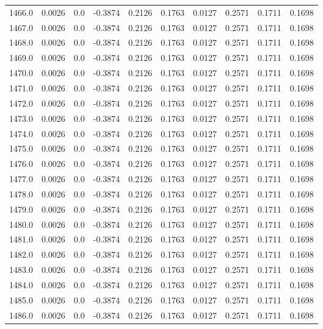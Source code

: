 \begin{longtable}{lrrrrrrrrr}
1466.0 & 0.0026 & 0.0 & -0.3874 & 0.2126 & 0.1763 & 0.0127 & 0.2571 & 0.1711 & 0.1698 \\
1467.0 & 0.0026 & 0.0 & -0.3874 & 0.2126 & 0.1763 & 0.0127 & 0.2571 & 0.1711 & 0.1698 \\
1468.0 & 0.0026 & 0.0 & -0.3874 & 0.2126 & 0.1763 & 0.0127 & 0.2571 & 0.1711 & 0.1698 \\
1469.0 & 0.0026 & 0.0 & -0.3874 & 0.2126 & 0.1763 & 0.0127 & 0.2571 & 0.1711 & 0.1698 \\
1470.0 & 0.0026 & 0.0 & -0.3874 & 0.2126 & 0.1763 & 0.0127 & 0.2571 & 0.1711 & 0.1698 \\
1471.0 & 0.0026 & 0.0 & -0.3874 & 0.2126 & 0.1763 & 0.0127 & 0.2571 & 0.1711 & 0.1698 \\
1472.0 & 0.0026 & 0.0 & -0.3874 & 0.2126 & 0.1763 & 0.0127 & 0.2571 & 0.1711 & 0.1698 \\
1473.0 & 0.0026 & 0.0 & -0.3874 & 0.2126 & 0.1763 & 0.0127 & 0.2571 & 0.1711 & 0.1698 \\
1474.0 & 0.0026 & 0.0 & -0.3874 & 0.2126 & 0.1763 & 0.0127 & 0.2571 & 0.1711 & 0.1698 \\
1475.0 & 0.0026 & 0.0 & -0.3874 & 0.2126 & 0.1763 & 0.0127 & 0.2571 & 0.1711 & 0.1698 \\
1476.0 & 0.0026 & 0.0 & -0.3874 & 0.2126 & 0.1763 & 0.0127 & 0.2571 & 0.1711 & 0.1698 \\
1477.0 & 0.0026 & 0.0 & -0.3874 & 0.2126 & 0.1763 & 0.0127 & 0.2571 & 0.1711 & 0.1698 \\
1478.0 & 0.0026 & 0.0 & -0.3874 & 0.2126 & 0.1763 & 0.0127 & 0.2571 & 0.1711 & 0.1698 \\
1479.0 & 0.0026 & 0.0 & -0.3874 & 0.2126 & 0.1763 & 0.0127 & 0.2571 & 0.1711 & 0.1698 \\
1480.0 & 0.0026 & 0.0 & -0.3874 & 0.2126 & 0.1763 & 0.0127 & 0.2571 & 0.1711 & 0.1698 \\
1481.0 & 0.0026 & 0.0 & -0.3874 & 0.2126 & 0.1763 & 0.0127 & 0.2571 & 0.1711 & 0.1698 \\
1482.0 & 0.0026 & 0.0 & -0.3874 & 0.2126 & 0.1763 & 0.0127 & 0.2571 & 0.1711 & 0.1698 \\
1483.0 & 0.0026 & 0.0 & -0.3874 & 0.2126 & 0.1763 & 0.0127 & 0.2571 & 0.1711 & 0.1698 \\
1484.0 & 0.0026 & 0.0 & -0.3874 & 0.2126 & 0.1763 & 0.0127 & 0.2571 & 0.1711 & 0.1698 \\
1485.0 & 0.0026 & 0.0 & -0.3874 & 0.2126 & 0.1763 & 0.0127 & 0.2571 & 0.1711 & 0.1698 \\
1486.0 & 0.0026 & 0.0 & -0.3874 & 0.2126 & 0.1763 & 0.0127 & 0.2571 & 0.1711 & 0.1698 \\

\end{longtable}
